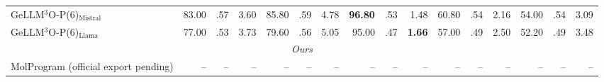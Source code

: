 \begin{table}[t]
{\begin{tabular}{lrrrrrrrrrrrrrrr}
    GeLLM$^3$O-P(6)$_{\mathrm{Mistral}}$ & 83.00 & .57 & 3.60 & 85.80 & .59 & 4.78 & \textbf{96.80} & .53 & 1.48 & 60.80 & .54 & 2.16 & 54.00 & .54 & 3.09 \\
    GeLLM$^3$O-P(6)$_{\mathrm{Llama}}$ & 77.00 & .53 & 3.73 & 79.60 & .56 & 5.05 & 95.00 & .47 & \textbf{1.66} & 57.00 & .49 & 2.50 & 52.20 & .49 & 3.48 \\
    \midrule
    \multicolumn{16}{c}{\textit{Ours}} \\
    MolProgram (official export pending) & -- & -- & -- & -- & -- & -- & -- & -- & -- & -- & -- & -- & -- & -- & -- \\
    \bottomrule
  \end{tabular}}
\end{table}

\begin{table}[t]
  \centering
  \caption{MuMOInstruct performance on out-of-distribution (OOD) tasks with
  20 candidates per input. External values are transcribed from Table~4 of
  \citet{dey2025gellm3o}; notation follows
  Table~\ref{tab:mumo-ind-full}.}
  \label{tab:mumo-ood-full}
  \setlength{\tabcolsep}{1.6pt}
  \renewcommand{\arraystretch}{0.90}
\end{table}
